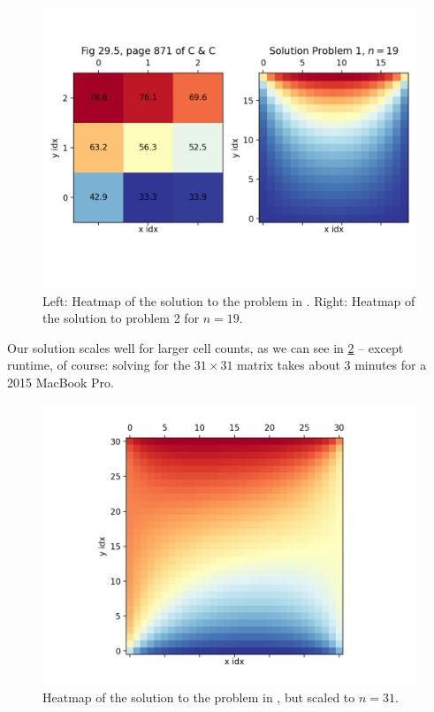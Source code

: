\documentclass[10pt,letterpaper,notitlepage]{article}
\begin{document}
	\begin{figure}
		\centering
		\includegraphics[width=0.9\linewidth]{heateqn.png}
		\caption[Heatmap]{Left: Heatmap of the solution to the problem in \cite[p. 871]{chapraNumericalMethodsEngineers2020}. Right: Heatmap of the solution to problem 2 for $n=19$.}
		\label{fig:heatmap3x3}
	\end{figure}
	Our solution scales well for larger cell counts, as we can see in \cref{fig:heatmap31x31} -- except runtime, of course: solving for the $31\times31$ matrix takes about 3 minutes for a 2015 MacBook Pro.
	\begin{figure}
		\centering
		\includegraphics[width=0.6\linewidth]{heateqn_31x31.png}
		\caption[Heatmap]{Heatmap of the solution to the problem in \cite[p. 871]{chapraNumericalMethodsEngineers2020}, but scaled to $n=31$.}
		\label{fig:heatmap31x31}
	\end{figure}
\end{document}
